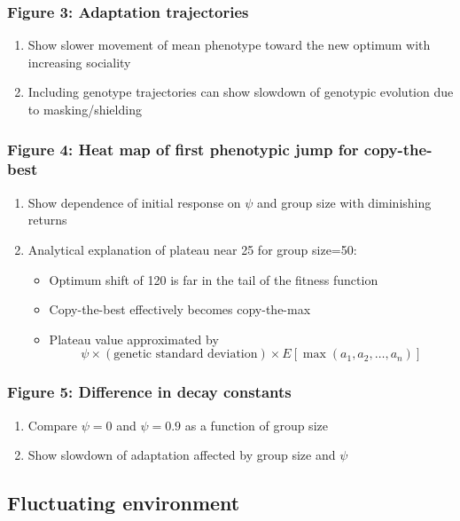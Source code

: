 \documentclass[12pt]{article}
\begin{document}
\subsubsection{Figure 3: Adaptation trajectories}
\begin{enumerate}
    \item Show slower movement of mean phenotype toward the new optimum with increasing sociality
    \item Including genotype trajectories can show slowdown of genotypic evolution due to masking/shielding
\end{enumerate}

\subsubsection{Figure 4: Heat map of first phenotypic jump for copy-the-best}
\begin{enumerate}
    \item Show dependence of initial response on $\psi$ and group size with diminishing returns
    \item Analytical explanation of plateau near 25 for group size=50:
    \begin{itemize}
        \item Optimum shift of 120 is far in the tail of the fitness function
        \item Copy-the-best effectively becomes copy-the-max
        \item Plateau value approximated by
        \[
            \psi \times (\text{genetic standard deviation}) \times E[\max(a_1, a_2, \ldots, a_n)]
        \]
    \end{itemize}
\end{enumerate}

\subsubsection{Figure 5: Difference in decay constants}
\begin{enumerate}
    \item Compare $\psi = 0$ and $\psi = 0.9$ as a function of group size
    \item Show slowdown of adaptation affected by group size and $\psi$
\end{enumerate}

\subsection{Fluctuating environment}
\end{document}
